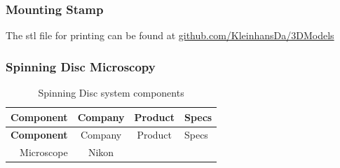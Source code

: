 \documentclass[11pt,singlespacinge,twoside]{reedthesis} %
\begin{document}
\hypertarget{mat-stamp}{%
\subsubsection{Mounting Stamp}\label{mat-stamp}}

The stl file for printing can be found at \href{https://github.com/KleinhansDa/3DModels}{github.com/KleinhansDa/3DModels}

\hypertarget{mat-SD}{%
\subsubsection{Spinning Disc Microscopy}\label{mat-SD}}
\begin{longtable}[]{@{}rccl@{}}
\caption{\label{tab:SDcomp} Spinning Disc system components}\tabularnewline
\toprule
\begin{minipage}[b]{0.20\columnwidth}\raggedleft
\textbf{Component}\strut
\end{minipage} & \begin{minipage}[b]{0.16\columnwidth}\centering
Company\strut
\end{minipage} & \begin{minipage}[b]{0.23\columnwidth}\centering
Product\strut
\end{minipage} & \begin{minipage}[b]{0.30\columnwidth}\raggedright
Specs\strut
\end{minipage}\tabularnewline
\midrule
\endfirsthead
\toprule
\begin{minipage}[b]{0.20\columnwidth}\raggedleft
\textbf{Component}\strut
\end{minipage} & \begin{minipage}[b]{0.16\columnwidth}\centering
Company\strut
\end{minipage} & \begin{minipage}[b]{0.23\columnwidth}\centering
Product\strut
\end{minipage} & \begin{minipage}[b]{0.30\columnwidth}\raggedright
Specs\strut
\end{minipage}\tabularnewline
\midrule
\endhead
\begin{minipage}[t]{0.20\columnwidth}\raggedleft
Microscope\strut
\end{minipage} & \begin{minipage}[t]{0.16\columnwidth}\centering
Nikon\strut
\end{minipage} & \begin{minipage}[t]{0.23\columnwidth}\centering

\end{minipage}
\end{longtable}
\end{document}
